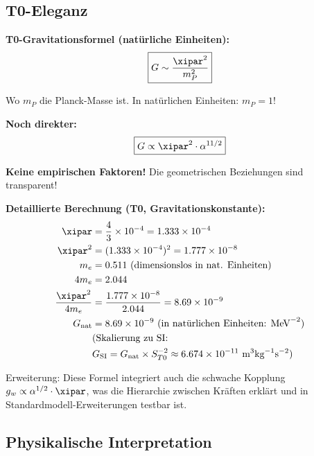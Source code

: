 	\subsection{T0-Eleganz}
	
	\begin{vorteil}
		\textbf{T0-Gravitationsformel (natürliche Einheiten):}
		\begin{equation}
			\boxed{G \sim \frac{\xipar^2}{m_P^2}}
		\end{equation}
		
		Wo $m_P$ die Planck-Masse ist. In natürlichen Einheiten: $m_P = 1$!
		
		\textbf{Noch direkter:}
		\begin{equation}
			\boxed{G \propto \xipar^2 \cdot \alpha^{11/2}}
		\end{equation}
		
		\textbf{Keine empirischen Faktoren!} Die geometrischen Beziehungen sind transparent!
		
		\textbf{Detaillierte Berechnung (T0, Gravitationskonstante):}
		\begin{align}
			\xipar &= \frac{4}{3} \times 10^{-4} = 1.333 \times 10^{-4} \\
			\xipar^2 &= (1.333 \times 10^{-4})^2 = 1.777 \times 10^{-8} \\
			m_e &= 0.511 \text{ (dimensionslos in nat. Einheiten)} \\
			4 m_e &= 2.044 \\
			\frac{\xipar^2}{4 m_e} &= \frac{1.777 \times 10^{-8}}{2.044} = 8.69 \times 10^{-9} \\
			G_{\text{nat}} &= 8.69 \times 10^{-9} \text{ (in natürlichen Einheiten: MeV}^{-2}\text{)} \\
			&\text{(Skalierung zu SI: } \\ 
			&G_{\text{SI}} = G_{\text{nat}} \times S_{T0}^{-2} \approx 6.674 \times 10^{-11} \text{ m}^3 \text{kg}^{-1} \text{s}^{-2}\text{)}
		\end{align}
		
		Erweiterung: Diese Formel integriert auch die schwache Kopplung $g_w \propto \alpha^{1/2} \cdot \xipar$, was die Hierarchie zwischen Kräften erklärt und in Standardmodell-Erweiterungen testbar ist.
	\end{vorteil}
	
	\subsection{Physikalische Interpretation}
	
